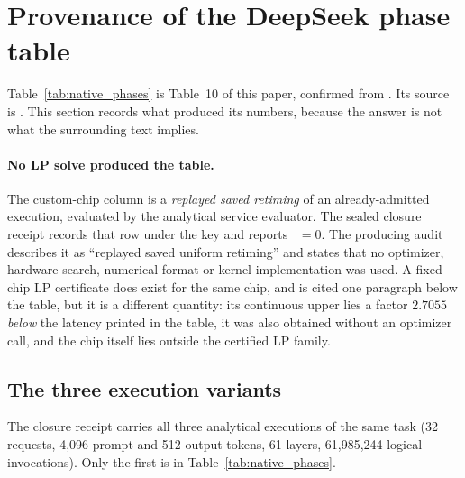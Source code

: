 %
%

\section{Provenance of the DeepSeek phase table}
\label{app:table10_provenance}

Table~\ref{tab:native_phases} is Table~10 of this paper, confirmed from
. Its source is . This
section records what produced its numbers, because the answer is not what the
surrounding text implies.

\paragraph{No LP solve produced the table.}
The custom-chip column is a \emph{replayed saved retiming} of an
already-admitted execution, evaluated by the analytical service evaluator. The
sealed closure receipt records that row under the key
 and reports
~$=0$. The producing audit describes it as
``replayed saved uniform retiming'' and states that no optimizer, hardware
search, numerical format or kernel implementation was used. A fixed-chip LP
certificate does exist for the same chip, and is cited one paragraph below the
table, but it is a different quantity: its continuous upper lies a factor
$2.7055$ \emph{below} the latency printed in the table, it was also obtained
without an optimizer call, and the chip itself lies outside the certified LP
family.

\subsection{The three execution variants}
The closure receipt carries all three analytical executions of the same task
(32 requests, 4,096 prompt and 512 output tokens, 61 layers, 61,985,244 logical
invocations). Only the first is in Table~\ref{tab:native_phases}.

